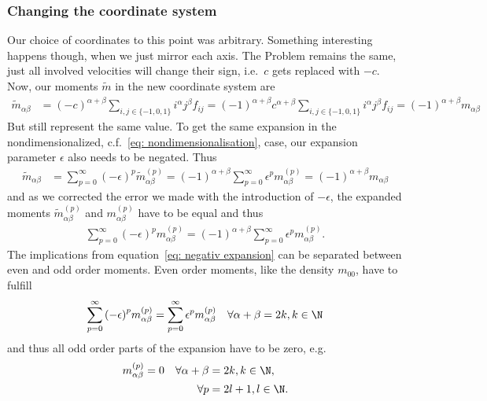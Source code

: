 \subsubsection{Changing the coordinate system}
\label{subs: Changing the coordinate system}
Our choice of coordinates to this point was arbitrary.
Something interesting happens though, when we just mirror each axis.
The Problem remains the same, just all involved velocities will change their sign, i.e.\ $c$ gets replaced with $-c$.
Now, our moments $\tilde{m}$ in the new coordinate system are
\begin{align}
  \tilde{m}_{\alpha\beta} &= {(-c)}^{\alpha + \beta}\sum_{i,j \in \{-1,0,1\}} i^\alpha j^\beta f_{ij}
  ={(-1)}^{\alpha + \beta}{c}^{\alpha + \beta}\sum_{i,j \in \{-1,0,1\}} i^\alpha j^\beta f_{ij}
  ={(-1)}^{\alpha + \beta}  m_{\alpha\beta}
\end{align}
But still represent the same value.
To get the same expansion in the nondimensionalized, c.f.~\eqref{eq: nondimensionalisation}, case, our expansion parameter $\epsilon$ also needs to be negated.
Thus
\begin{align}
    \tilde{m}_{\alpha\beta}
    & = \sum_{p=0}^{\infty} {(-\epsilon)}^p \tilde{m}_{\alpha\beta}^{(p)}
     = {(-1)}^{\alpha + \beta} \sum_{p=0}^{\infty} \epsilon^p m_{\alpha\beta}^{(p)}
    = {(-1)}^{\alpha + \beta}  m_{\alpha\beta}
\end{align}
and as we corrected the error we made with the introduction of $-\epsilon$, the expanded moments $\tilde{m}_{\alpha\beta}^{(p)}$ and $m_{\alpha\beta}^{(p)}$ have to be equal and thus
\begin{align}
  \label{eq: negativ expansion}
  \sum_{p=0}^{\infty} {(-\epsilon)}^p m_{\alpha\beta}^{(p)}
  = {(-1)}^{\alpha + \beta} \sum_{p=0}^{\infty} \epsilon^p m_{\alpha\beta}^{(p)}.
\end{align}
The implications from equation~\eqref{eq: negativ expansion} can be separated between even and odd order moments.
Even order moments, like the density $m_{00}$, have to fulfill
\begin{align}
  \label{eq: negativ expansion even}
  \sum_{p=0}^{\infty} {(-\epsilon)}^p m_{\alpha\beta}^{(p)}
  = \sum_{p=0}^{\infty} \epsilon^p m_{\alpha\beta}^{(p)} \quad \forall \alpha+\beta=2k, k\in\N
\end{align}
and thus all odd order parts of the expansion have to be zero, e.g.
\begin{equation}
  \label{eq: kill even moments odd order}
  \begin{aligned}
    m_{\alpha\beta}^{(p)} = 0 \quad
    \forall\alpha+\beta & = 2k, k\in\N, \\
    \forall p & = 2l+1, l\in\N.
  \end{aligned}
\end{equation}
